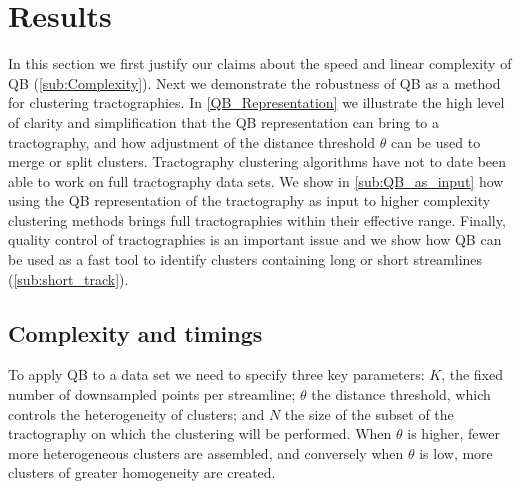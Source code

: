 \documentclass{bioinfo}
\begin{document}
\section{Results}

In this section we first justify our claims about the speed and linear
complexity of QB (\ref{sub:Complexity}). Next we demonstrate the
robustness of QB as a method for clustering tractographies.  In
\ref{QB_Representation} we illustrate the high level of clarity and
simplification that the QB representation can bring to a tractography,
and how adjustment of the distance threshold $\theta$ can be used to
merge or split clusters.
Tractography clustering algorithms have not to date been able to work on
full tractography data sets. We show in \ref{sub:QB_as_input} how using
the QB representation of the tractography as input to higher complexity
clustering methods brings full tractographies within their effective
range.
\noindent
Finally, quality control of tractographies is an important issue and we
show how QB can be used as a fast tool to identify clusters containing
long or short streamlines (\ref{sub:short_track}).

\subsection{Complexity and timings\label{sub:Complexity}}

To apply QB to a data set we need to specify three key parameters: $K$,
the fixed number of downsampled points per streamline; $\theta$ the
distance threshold, which controls the heterogeneity of clusters; and
$N$ the size of the subset of the tractography on which the clustering
will be performed. When $\theta$ is higher, fewer more heterogeneous
clusters are assembled, and conversely when $\theta$ is low, more
clusters of greater homogeneity are created.
\end{document}
